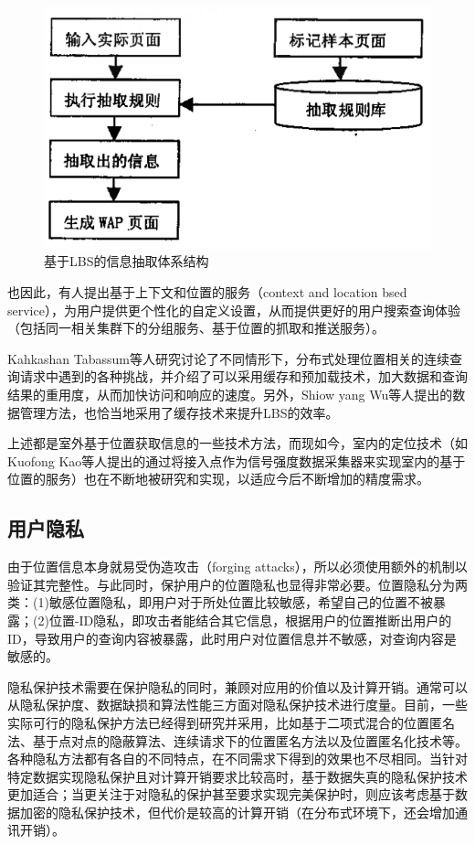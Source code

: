 \documentclass{article}
\begin{document}
\begin{CJK}{UTF8}{gbsn}
	\begin{figure}[htbp]
		\centering
		\includegraphics[bb=0 0 548 341, scale=0.45]{figure/fig_D11-2.png}
		\caption{基于LBS的信息抽取体系结构}
		\label{fig:D11-2-1}
	\end{figure}

  也因此，有人提出基于上下文和位置的服务（context and location bsed service）\cite{D05}，为用户提供更个性化的自定义设置，从而提供更好的用户搜索查询体验（包括同一相关集群下的分组服务\cite{D05}、基于位置的抓取和推送服务\cite{D04}）。

  Kahkashan Tabassum等人研究讨论了不同情形下，分布式处理位置相关的连续查询请求中遇到的各种挑战\cite{D08}，并介绍了可以采用缓存和预加载技术，加大数据和查询结果的重用度，从而加快访问和响应的速度。另外，Shiow yang Wu等人提出的数据管理方法\cite{D06}，也恰当地采用了缓存技术来提升LBS的效率。

  上述都是室外基于位置获取信息的一些技术方法，而现如今，室内的定位技术（如Kuofong Kao等人提出的通过将接入点作为信号强度数据采集器来实现室内的基于位置的服务\cite{D03}）也在不断地被研究和实现，以适应今后不断增加的精度需求。

	\subsection{用户隐私}
  由于位置信息本身就易受伪造攻击（forging attacks），所以必须使用额外的机制以验证其完整性\cite{P04}。与此同时，保护用户的位置隐私也显得非常必要。位置隐私分为两类\cite{P02}：(1)敏感位置隐私，即用户对于所处位置比较敏感，希望自己的位置不被暴露；(2)位置-ID隐私，即攻击者能结合其它信息，根据用户的位置推断出用户的ID，导致用户的查询内容被暴露，此时用户对位置信息并不敏感，对查询内容是敏感的。

  隐私保护技术需要在保护隐私的同时，兼顾对应用的价值以及计算开销。通常可以从隐私保护度、数据缺损和算法性能三方面对隐私保护技术进行度量\cite{P01}。目前，一些实际可行的隐私保护方法已经得到研究并采用，比如基于二项式混合的位置匿名法\cite{P03}、基于点对点的隐蔽算法\cite{P05}、连续请求下的位置匿名方法\cite{P02}以及位置匿名化技术\cite{P01}等。各种隐私方法都有各自的不同特点，在不同需求下得到的效果也不尽相同。当针对特定数据实现隐私保护且对计算开销要求比较高时，基于数据失真的隐私保护技术更加适合；当更关注于对隐私的保护甚至要求实现完美保护时，则应该考虑基于数据加密的隐私保护技术，但代价是较高的计算开销（在分布式环境下，还会增加通讯开销）\cite{P01}。



\end{CJK}
\end{document}
